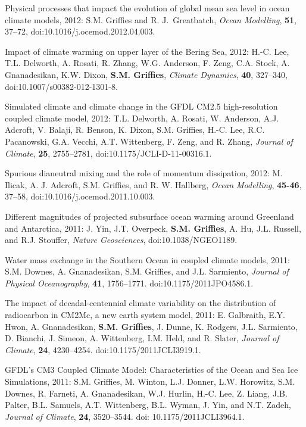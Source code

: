 \begin{etaremune}
\item Physical processes that impact the evolution of global mean sea
  level in ocean climate models, 2012: S.M. Grif\/f\/ies and R. J.\
  Greatbatch, {\it Ocean Modelling}, {\bf 51}, 37--72,
  doi:10.1016/j.ocemod.2012.04.003.

\item Impact of climate warming on upper layer of the Bering Sea,
  2012: H.-C. Lee, T.L. Delworth, A. Rosati, R. Zhang, W.G. Anderson,
  F. Zeng, C.A. Stock, A. Gnanadesikan, K.W. Dixon, {\bf
    S.M. Grif\/f\/ies}, {\it Climate Dynamics}, {\bf 40}, 327–340,
  doi:10.1007/s00382-012-1301-8.

\item Simulated climate and climate change in the GFDL CM2.5
  high-resolution coupled climate model, 2012: T.L. Delworth,
  A. Rosati, W. Anderson, A.J. Adcroft, V. Balaji, R. Benson,
  K. Dixon, S.M. Grif\/f\/ies, H.-C. Lee, R.C. Pacanowski,
  G.A. Vecchi, A.T. Wittenberg, F. Zeng, and R. Zhang, {\it Journal of
    Climate}, {\bf 25}, 2755--2781, doi:10.1175/JCLI-D-11-00316.1.

\item Spurious dianeutral mixing and the role of momentum dissipation,
  2012: M. Ilicak, A. J. Adcroft, S.M. Grif\/f\/ies, and
  R. W. Hallberg, {\it Ocean Modelling}, {\bf 45-46}, 37--58,
  doi:10.1016/j.ocemod.2011.10.003.

\item Different magnitudes of projected subsurface ocean warming
  around Greenland and Antarctica, 2011: J. Yin, J.T. Overpeck, {\bf
    S.M. Grif\/f\/ies}, A. Hu, J.L. Russell, and R.J. Stouffer, {\it
    Nature Geosciences}, doi:10.1038/NGEO1189.

\item Water mass exchange in the Southern Ocean in coupled climate
  models, 2011: S.M. Downes, A. Gnanadesikan, S.M. Grif\/f\/ies,
  and J.L. Sarmiento, {\it Journal of Physical Oceanography}, {\bf
    41}, 1756--1771.  doi:10.1175/2011JPO4586.1.

\item The impact of decadal-centennial climate variability on the
  distribution of radiocarbon in CM2Mc, a new earth system model,
  2011: E. Galbraith, E.Y. Hwon, A. Gnanadesikan, {\bf
    S.M. Grif\/f\/ies}, J. Dunne, K. Rodgers, J.L. Sarmiento, D.
  Bianchi, J. Simeon, A. Wittenberg, I.M. Held, and R.  Slater, {\it
    Journal of Climate}, {\bf 24}, 4230--4254.
  doi:10.1175/2011JCLI3919.1.

\item GFDL's CM3 Coupled Climate Model: Characteristics of the Ocean
  and Sea Ice Simulations, 2011: S.M. Grif\/f\/ies, M. Winton,
  L.J. Donner, L.W. Horowitz, S.M. Downes, R.  Farneti,
  A. Gnanadesikan, W.J. Hurlin, H.-C. Lee, Z. Liang, J.B. Palter,
  B.L. Samuels, A.T. Wittenberg, B.L. Wyman, J.  Yin, and N.T. Zadeh,
  {\it Journal of Climate}, {\bf 24}, 3520--3544.  doi:
  10.1175/2011JCLI3964.1.


\end{etaremune}
